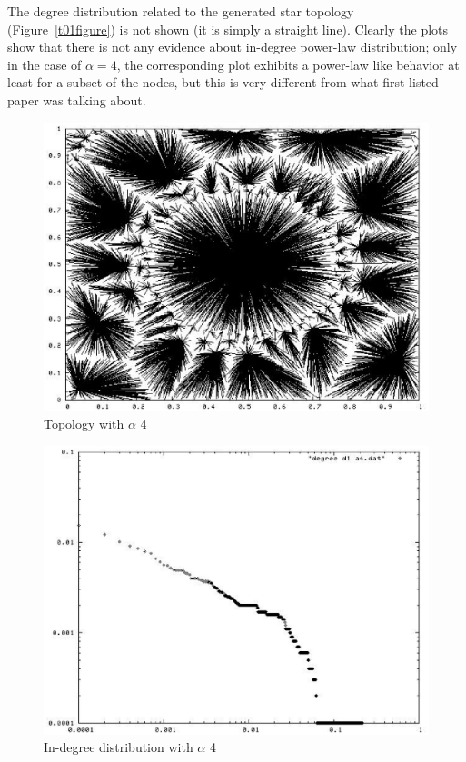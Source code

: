 \documentclass[a4paper,11pt]{article}
\begin{document}
The degree distribution related to the generated star topology 
(Figure~\ref{t01figure}) is not 
shown (it is simply a straight line).
Clearly the plots show that there is not any evidence about in-degree 
power-law distribution; only in the case of $\alpha = 4$, the corresponding 
plot exhibits a power-law like behavior at least for a subset of the nodes, 
but this is very different from what first listed paper was talking about.

\begin{figure}[tb!]
\begin{center}
\includegraphics[scale=0.6]{pic_alfa4.eps}
\end{center}
\caption{Topology with $\alpha$ 4\label{t4figure}}
\end{figure}

\begin{figure}[tb!]
\begin{center}
\includegraphics[scale=0.6]{picdegree_alfa4.eps}
\end{center}
\caption{In-degree distribution with $\alpha$ 4 \label{d4figure}}
\end{figure}
\end{document}
